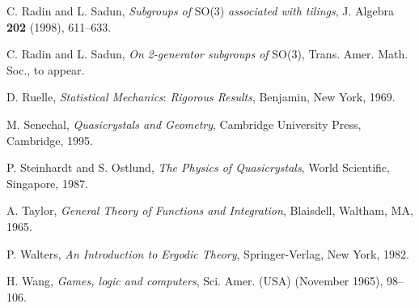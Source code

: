 \documentclass[reqno]{stml-l}
\theoremstyle{plain}
\theoremstyle{definition}
\numberwithin{equation}{chapter}
\begin{document}
\begin{thebibliography}{99}
 C. Radin and L. Sadun, \emph{Subgroups of} SO(3) \emph{associated with tilings}, J. Algebra \textbf{202} (1998), 611--633.

 C. Radin and L. Sadun, \emph{On} \emph{2-generator subgroups of} SO(3), Trans. Amer. Math. Soc., to appear.

 D. Ruelle, \emph{Statistical Mechanics}: \emph{Rigorous Results}, Benjamin, New York, 1969.

 M. Senechal, \emph{Quasicrystals and Geometry}, Cambridge University Press, Cambridge, 1995.

 P. Steinhardt and S. Ostlund, \emph{The Physics of Quasicrystals}, World Scientific, Singapore, 1987.

 A. Taylor, \emph{General Theory of Functions and Integration}, Blaisdell, Waltham, MA, 1965.

 P. Walters, \emph{An Introduction to Ergodic Theory}, Springer-Verlag, New York, 1982.

 H. Wang, \emph{Games, logic and computers}, Sci. Amer. (USA) (November 1965), 98--106.
\end{thebibliography}
\end{document}
